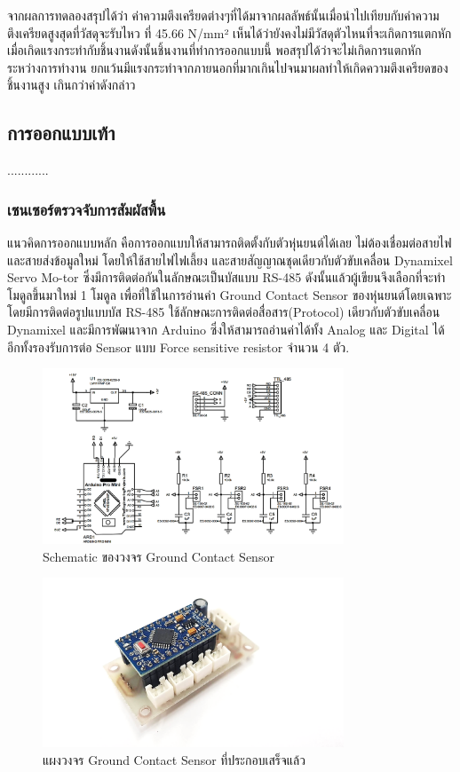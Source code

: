 จากผลการทดลองสรุปได้ว่า ค่าความตึงเครียดต่างๆที่ได้มาจากผลลัพธ์นั้นเมื่อนำไปเทียบกับค่าความตึงเครียดสูงสุดที่วัสดุจะรับไหว
ที่ 45.66 N/mm² เห็นได้ว่ายังคงไม่มีวัสดุตัวไหนที่จะเกิดการแตกหักเมื่อเกิดแรงกระทำกับชิ้นงานดังนั้นชิ้นงานที่ทำการออกแบบนี้
พอสรุปได้ว่าจะไม่เกิดการแตกหักระหว่างการทำงาน ยกแว้นมีแรงกระทำจากภายนอกที่มากเกินไปจนมาผลทำให้เกิดความตึงเครียดของชิ้นงานสูง
เกินกว่าค่าดังกล่าว  

\subsection{การออกแบบเท้า}
............
\subsubsection{เซนเซอร์ตรวจจับการสัมผัสพื้น}
แนวคิดการออกแบบหลัก คือการออกแบบให้สามารถติดตั้งกับตัวหุ่นยนต์ได้เลย ไม่ต้องเชื่อมต่อสายไฟและสายส่งข้อมูลใหม่ โดยให้ใช้สายไฟไฟเลี้ยง 
และสายสัญญาณชุดเดียวกับตัวขับเคลื่อน Dynamixel Servo Mo-tor ซึ่งมีการติดต่อกันในลักษณะเป็นบัสแบบ RS-485 ดังนั้นแล้วผู้เขียนจึงเลือกที่จะทำโมดูลขึ้นมาใหม่ 1 โมดูล 
เพื่อที่ใช้ในการอ่านค่า Ground Contact Sensor ของหุ่นยนต์โดยเฉพาะ โดยมีการติดต่อรูปแบบบัส RS-485 ใช้ลักษณะการติดต่อสื่อสาร(Protocol) เดียวกับตัวขับเคลื่อน Dynamixel 
และมีการพัฒนาจาก Arduino ซึ่งให้สามารถอ่านค่าได้ทั้ง Analog และ Digital ได้ อีกทั้งรองรับการต่อ Sensor แบบ Force sensitive resistor จำนวน 4 ตัว.

\clearpage
\begin{figure}[h!]
  \centering
  \includegraphics[width=0.8\textwidth]{chapter4/images/FSR_schematic.png}
  \caption{Schematic ของวงจร Ground Contact Sensor}
  \label{fig:FSR_schematic}
\end{figure}

\begin{figure}[h!]
  \centering
  \includegraphics[width=0.8\textwidth]{chapter4/images/complete_FSR.png}
  \caption{แผงวงจร Ground Contact Sensor ที่ประกอบเสร็จแล้ว}
  \label{fig:complete_FSR}
\end{figure}

